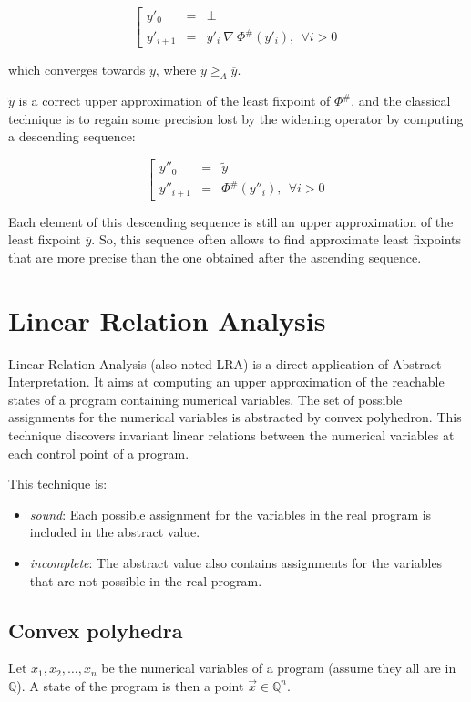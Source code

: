 \documentclass[a4paper,english,titlepage,11pt]{article}
\newcommand*\system[1]{\left[ \begin{array}{lllll}#1 \end{array}\right.}
\def\Q{\mathbb{Q}}
\begin{document}
$$\system{
y'_0 &=& \perp \\
y'_{i+1} &=& y'_i\ \nabla\ \Phi^\#(y'_i),\ \ \forall i > 0
}$$

which converges towards $\tilde{y}$, where $\tilde{y} \geq_A \overline{y}$.

$\tilde{y}$ is a correct upper approximation of the least fixpoint of $\Phi^\#$,
and the classical technique is to regain some precision lost by the widening
operator by computing a descending sequence:

$$\system{
y''_0 &=& \tilde{y} \\
y''_{i+1} &=& \Phi^\#(y''_i), \ \ \forall i > 0
}$$

Each element of this descending sequence is still an upper approximation of the
least fixpoint $\overline{y}$. So, this sequence often allows to find
approximate least fixpoints that are more precise than the one obtained after
the ascending sequence.

\section{Linear Relation Analysis}

Linear Relation Analysis \cite{CH78} (also noted LRA) is a direct application of
Abstract Interpretation. It aims at computing an upper approximation of the
reachable states of a program containing numerical variables. The set of
possible assignments for the numerical variables is abstracted by convex
polyhedron. This technique discovers invariant linear relations between
the numerical variables at each control point of a program.

This technique is:
\begin{itemize}
\item \emph{sound}: Each possible assignment for the variables in the real
program is included in the abstract value.
\item \emph{incomplete}: The abstract value also contains assignments for the
variables that are not possible in the real program.
\end{itemize}

\subsection{Convex polyhedra}

Let $x_1, x_2, \dots ,x_n$ be the numerical variables of a program (assume they
all are in $\Q$). A state of
the program is then a point $\overrightarrow{x} \in \Q^n$.
\end{document}
